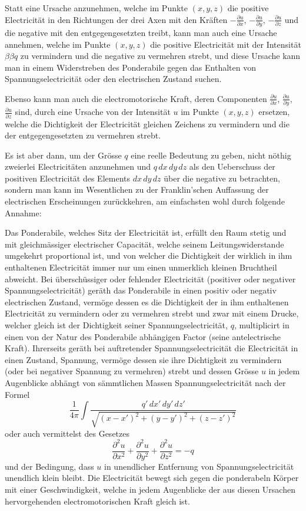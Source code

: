 \documentclass[12pt,a4paper]{article}
\begin{document}
Statt eine Ursache anzunehmen, welche im Punkte $(x,y,z)$ die positive Electricit\"at in den Richtungen der drei Axen mit den Kr\"aften $-\frac{\partial u}{\partial x}$, $-\frac{\partial u}{\partial y}$, $-\frac{\partial u}{\partial z}$ und die negative mit den entgegengesetzten treibt, kann man auch eine Ursache annehmen, welche im Punkte $(x,y,z)$ die positive Electricit\"at mit der Intensit\"at $\beta\beta q$ zu vermindern und die negative zu vermehren strebt, und diese Ursache kann man in einem Widerstreben des Ponderabile gegen das Enthalten von Spannungselectricit\"at oder den electrischen Zustand suchen.

Ebenso kann man auch die electromotorische Kraft, deren Componenten $\frac{\partial u}{\partial x}$, $\frac{\partial u}{\partial y}$, $\frac{\partial u}{\partial z}$ sind, durch eine Ursache von der Intensit\"at $u$ im Punkte $(x,y,z)$ ersetzen, welche die Dichtigkeit der Electricit\"at gleichen Zeichens zu vermindern und die der entgegengesetzten zu vermehren strebt.

Es ist aber dann, um der Gr\"osse $q$ eine reelle Bedeutung zu geben, nicht n\"othig zweierlei Electricit\"aten anzunehmen und $q\,dx\,dy\,dz$ als den Ueberschuss der positiven Electricit\"at des Elements $dx\,dy\,dz$ \"uber die negative zu betrachten, sondern man kann im Wesentlichen zu der Franklin'schen Auffassung der electrischen Erscheinungen zur\"uckkehren, am einfachsten wohl durch folgende Annahme:

Das Ponderabile, welches Sitz der Electricit\"at ist, erf\"ullt den Raum stetig und mit gleichm\"assiger electrischer Capacit\"at, welche seinem Leitungswiderstande umgekehrt proportional ist, und von welcher die Dichtigkeit der wirklich in ihm enthaltenen Electricit\"at immer nur um einen unmerklich kleinen Bruchtheil abweicht. Bei \"ubersch\"ussiger oder fehlender Electricit\"at (positiver oder negativer Spannungselectricit\"at) ger\"ath das Ponderabile in einen positiv oder negativ electrischen Zustand, verm\"oge dessen es die Dichtigkeit der in ihm enthaltenen Electricit\"at zu vermindern oder zu vermehren strebt und zwar mit einem Drucke, welcher gleich ist der Dichtigkeit seiner Spannungselectricit\"at, $q$, multiplicirt in einen von der Natur des Ponderabile abh\"angigen Factor (seine antelectrische Kraft). Ihrerseits ger\"ath bei auftretender Spannungselectricit\"at die Electricit\"at in einen Zustand, Spannung, verm\"oge dessen sie ihre Dichtigkeit zu vermindern (oder bei negativer Spannung zu vermehren) strebt und dessen Gr\"osse $u$ in jedem Augenblicke abh\"angt von s\"ammtlichen Massen Spannungselectricit\"at nach der Formel
\[
\frac{1}{4\pi}\int \frac{q'\,dx'\,dy'\,dz'}{\sqrt{(x-x')^2 + (y-y')^2 + (z-z')^2}}
\]
oder auch vermittelst des Gesetzes
\[
\frac{\partial^2 u}{\partial x^2} + \frac{\partial^2 u}{\partial y^2} + \frac{\partial^2 u}{\partial z^2} = -q
\]
und der Bedingung, dass $u$ in unendlicher Entfernung von Spannungselectricit\"at unendlich klein bleibt. Die Electricit\"at bewegt sich gegen die ponderabeln K\"orper mit einer Geschwindigkeit, welche in jedem Augenblicke der aus diesen Ursachen hervorgehenden electromotorischen Kraft gleich ist.
\end{document}
